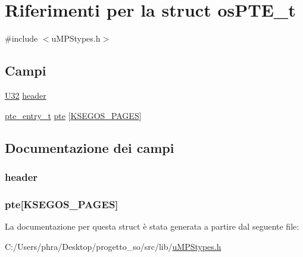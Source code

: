 \hypertarget{structos_p_t_e__t}{\section{Riferimenti per la struct os\-P\-T\-E\-\_\-t}
\label{structos_p_t_e__t}
}


{\ttfamily \#include $<$u\-M\-P\-Stypes.\-h$>$}

\subsection*{Campi}
\begin{DoxyCompactItemize}
\item 
\hyperlink{base_8h_ac3df7cf3c8cb172a588adec881447d68}{U32} \hyperlink{structos_p_t_e__t_a45eed61436d7fec550ec1071e528d577}{header}
\item 
\hyperlink{structpte__entry__t}{pte\-\_\-entry\-\_\-t} \hyperlink{structos_p_t_e__t_ad45fccfb8a59bcf4aae80b3282dd835e}{pte} \mbox{[}\hyperlink{const_8h_ab5c2c6e008c8304671037d897fe670e7}{K\-S\-E\-G\-O\-S\-\_\-\-P\-A\-G\-E\-S}\mbox{]}
\end{DoxyCompactItemize}


\subsection{Documentazione dei campi}
\hypertarget{structos_p_t_e__t_a45eed61436d7fec550ec1071e528d577}{
\subsubsection[{header}]{ header}}\label{structos_p_t_e__t_a45eed61436d7fec550ec1071e528d577}
\hypertarget{structos_p_t_e__t_ad45fccfb8a59bcf4aae80b3282dd835e}{
\subsubsection[{pte}]{ pte\mbox{[}{\bf K\-S\-E\-G\-O\-S\-\_\-\-P\-A\-G\-E\-S}\mbox{]}}}\label{structos_p_t_e__t_ad45fccfb8a59bcf4aae80b3282dd835e}


La documentazione per questa struct è stata generata a partire dal seguente file\-:\begin{DoxyCompactItemize}
\item 
C\-:/\-Users/phra/\-Desktop/progetto\-\_\-so/src/lib/\hyperlink{u_m_p_stypes_8h}{u\-M\-P\-Stypes.\-h}\end{DoxyCompactItemize}
